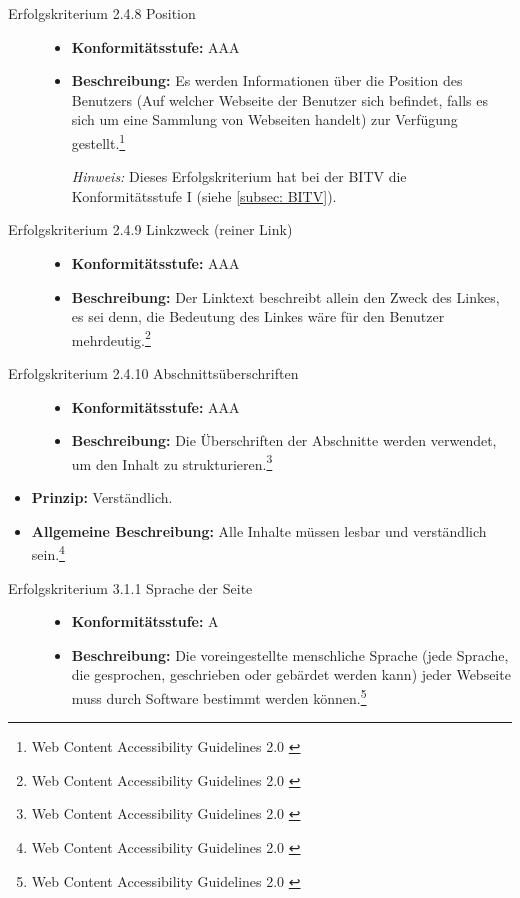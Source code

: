 \begin{description}
\begin{description}
		\item[Erfolgskriterium 2.4.8 Position]\hfill
		\begin{itemize}
			\item \textbf{Konformitätsstufe:} AAA
			\item \textbf{Beschreibung:} Es werden Informationen über die Position des Benutzers (Auf welcher Webseite der Benutzer sich befindet, falls es sich um eine 
			Sammlung von Webseiten handelt) zur Verfügung gestellt.\footnote{Web Content Accessibility Guidelines 2.0 \cite{WCAG2.0}}
			
			\textit{Hinweis:} Dieses Erfolgskriterium hat bei der \ac{BITV} die Konformitätsstufe I (siehe \cref{subsec: BITV}).
		\end{itemize}
		
		\item[Erfolgskriterium 2.4.9 Linkzweck (reiner Link)]\hfill
		\begin{itemize}
			\item \textbf{Konformitätsstufe:} AAA
			\item \textbf{Beschreibung:} Der Linktext beschreibt allein den Zweck des Linkes, es sei denn, die Bedeutung des Linkes wäre für den Benutzer 
			mehrdeutig.\footnote{Web Content Accessibility Guidelines 2.0 \cite{WCAG2.0}}
		\end{itemize}
		
		\item[Erfolgskriterium 2.4.10 Abschnittsüberschriften]\hfill
		\begin{itemize}
			\item \textbf{Konformitätsstufe:} AAA
			\item \textbf{Beschreibung:} Die Überschriften der Abschnitte werden verwendet, um den Inhalt zu 
			strukturieren.\footnote{Web Content Accessibility Guidelines 2.0 \cite{WCAG2.0}}
		\end{itemize}
	\end{description}	
	
	\item[Richtlinie 3.1 Lesbar]\hfill
	\begin{itemize}
		\item \textbf{Prinzip:} Verständlich.
		\item \textbf{Allgemeine Beschreibung:} Alle Inhalte müssen lesbar und verständlich sein.\footnote{Web Content Accessibility Guidelines 2.0 \cite{WCAG2.0}}
	\end{itemize}
	
	\begin{description}
		\item[Erfolgskriterium 3.1.1 Sprache der Seite]\hfill
		\begin{itemize}
			\item \textbf{Konformitätsstufe:} A
			\item \textbf{Beschreibung:} Die voreingestellte menschliche Sprache (jede Sprache, die gesprochen, geschrieben oder gebärdet werden kann) jeder Webseite muss 
			durch Software bestimmt werden können.\footnote{Web Content Accessibility Guidelines 2.0 \cite{WCAG2.0}}
		\end{itemize}
		

\end{description}
\end{description}
